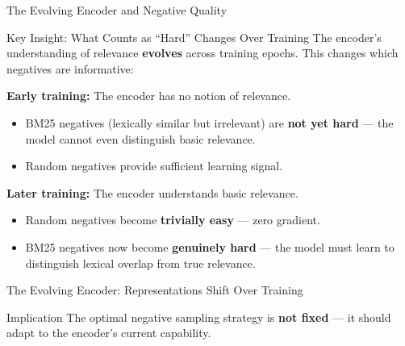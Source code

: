 \documentclass[aspectratio=169]{beamer}
\newif\ifanimated
\newcommand{\cpause}{\ifanimated\pause\fi}
\begin{document}
\begin{frame}{The Evolving Encoder and Negative Quality}
\begin{block}{Key Insight: What Counts as ``Hard'' Changes Over Training}
The encoder's understanding of relevance \textbf{evolves} across training epochs. This changes which negatives are informative:
\end{block}

\cpause
\vspace{0.5em}

\textbf{Early training:} The encoder has no notion of relevance.
\begin{itemize}
    \item BM25 negatives (lexically similar but irrelevant) are \textbf{not yet hard} --- the model cannot even distinguish basic relevance.
    \item Random negatives provide sufficient learning signal.
\end{itemize}

\cpause
\vspace{0.5em}

\textbf{Later training:} The encoder understands basic relevance.
\begin{itemize}
    \item Random negatives become \textbf{trivially easy} --- zero gradient.
    \item BM25 negatives now become \textbf{genuinely hard} --- the model must learn to distinguish lexical overlap from true relevance.
\end{itemize}

\end{frame}


\begin{frame}[shrink=15]{The Evolving Encoder: Representations Shift Over Training}
\begin{center}

\end{center}

\cpause
\vspace{0.3em}

\begin{alertblock}{Implication}
The optimal negative sampling strategy is \textbf{not fixed} --- it should adapt to the encoder's current capability.
\end{alertblock}
\end{frame}
\end{document}
